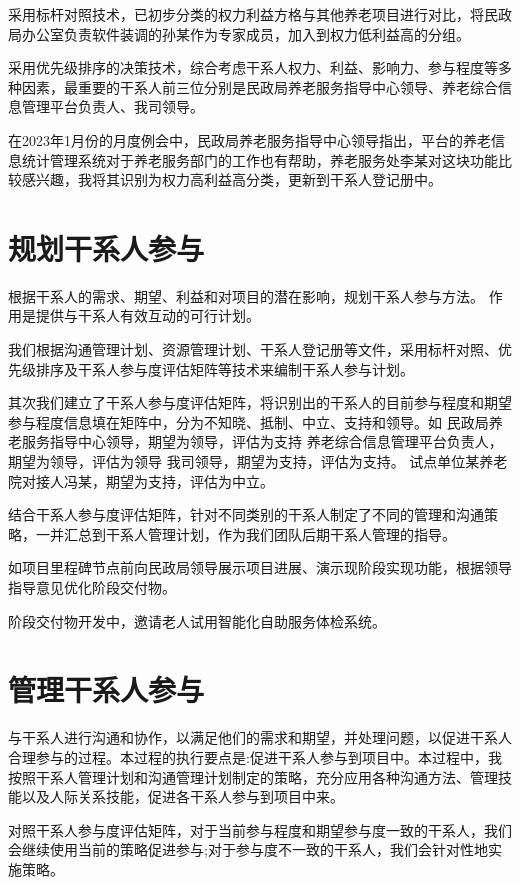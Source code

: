 \documentclass[UTF8]{../computerUniverse}
\begin{document}
采用标杆对照技术，已初步分类的权力利益方格与其他养老项目进行对比，将民政局办公室负责软件装调的孙某作为专家成员，加入到权力低利益高的分组。

采用优先级排序的决策技术，综合考虑干系人权力、利益、影响力、参与程度等多种因素，最重要的干系人前三位分别是民政局养老服务指导中心领导、养老综合信息管理平台负责人、我司领导。

在2023年1月份的月度例会中，民政局养老服务指导中心领导指出，平台的养老信息统计管理系统对于养老服务部门的工作也有帮助，养老服务处李某对这块功能比较感兴趣，我将其识别为权力高利益高分类，更新到干系人登记册中。




\section{规划干系人参与}

根据干系人的需求、期望、利益和对项目的潜在影响，规划干系人参与方法。
作用是提供与干系人有效互动的可行计划。

我们根据沟通管理计划、资源管理计划、干系人登记册等文件，采用标杆对照、优先级排序及干系人参与度评估矩阵等技术来编制干系人参与计划。


其次我们建立了干系人参与度评估矩阵，将识别出的干系人的目前参与程度和期望参与程度信息填在矩阵中，分为不知晓、抵制、中立、支持和领导。如
民政局养老服务指导中心领导，期望为领导，评估为支持
养老综合信息管理平台负责人，期望为领导，评估为领导
我司领导，期望为支持，评估为支持。
试点单位某养老院对接人冯某，期望为支持，评估为中立。

结合干系人参与度评估矩阵，针对不同类别的干系人制定了不同的管理和沟通策略，一并汇总到干系人管理计划，作为我们团队后期干系人管理的指导。%

如项目里程碑节点前向民政局领导展示项目进展、演示现阶段实现功能，根据领导指导意见优化阶段交付物。

阶段交付物开发中，邀请老人试用智能化自助服务体检系统。


\section{管理干系人参与}


与干系人进行沟通和协作，以满足他们的需求和期望，并处理问题，以促进干系人合理参与的过程。本过程的执行要点是:促进干系人参与到项目中。本过程中，我按照干系人管理计划和沟通管理计划制定的策略，充分应用各种沟通方法、管理技能以及人际关系技能，促进各干系人参与到项目中来。

对照干系人参与度评估矩阵，对于当前参与程度和期望参与度一致的干系人，我们会继续使用当前的策略促进参与;对于参与度不一致的干系人，我们会针对性地实施策略。
\end{document}
